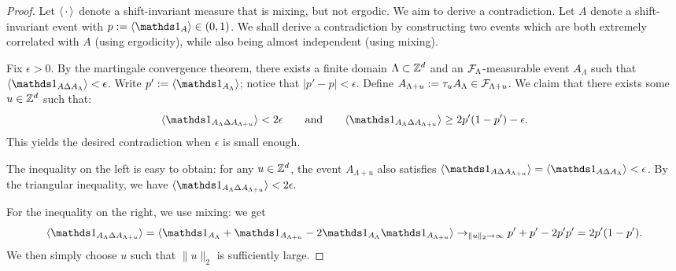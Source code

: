 \begin{proof}
    Let $\langle\,\cdot\,\rangle$ denote a shift-invariant measure that is mixing, but not ergodic.
    We aim to derive a contradiction.
    Let $A$ denote a shift-invariant event with $p:=\langle\ind{A}\rangle\in(0,1)$.
    We shall derive a contradiction by constructing two events which
    are both extremely correlated with $A$ (using ergodicity),
    while also being almost independent (using mixing).

    Fix $\epsilon>0$.
    By the martingale convergence theorem,
    there exists a finite domain $\Lambda\subset\mathbb Z^d$
    and an $\mathcal F_\Lambda$-measurable event
    $A_\Lambda$
    such that
    $\langle \ind{A\Delta A_\Lambda}\rangle<\epsilon$.
    Write $p':=\langle \ind{A_\Lambda}\rangle$;
    notice that $|p'-p|<\epsilon$.
    Define $A_{\Lambda+u}:=\tau_uA_\Lambda\in\mathcal F_{\Lambda+u}$.
    We claim that there exists some $u\in\mathbb Z^d$ such that:
    \[
        \langle \ind{A_\Lambda\Delta A_{\Lambda+u}}\rangle
        <2\epsilon
        \qquad
        \text{and}
        \qquad
        \langle \ind{A_\Lambda\Delta A_{\Lambda+u}}\rangle
        \geq 2p'(1-p')-\epsilon.
    \]
    This yields the desired contradiction when $\epsilon$ is small enough.

    The inequality on the left is easy to obtain:
    for any $u\in\mathbb Z^d$,
    the event $A_{\Lambda+u}$
    also satisfies
    $\langle \ind{A\Delta A_{\Lambda+u}}\rangle=\langle \ind{A\Delta A_\Lambda}\rangle<\epsilon$.
    By the triangular inequality, we have
    \(
        \langle \ind{A_\Lambda\Delta A_{\Lambda+u}}\rangle
        <2\epsilon.
    \)

    For the inequality on the right, we use mixing:
    we get
    \[
        \langle \ind{A_\Lambda\Delta A_{\Lambda+u}}\rangle
        =
        \langle \ind{A_\Lambda}+\ind{A_{\Lambda+u}}
        -
        2 \ind{A_\Lambda}\ind{A_{\Lambda+u}}\rangle
        \to_{\|u\|_2\to\infty}
        p'+p'-2p'p'
        =2p'(1-p').
    \]
    We then simply choose $u$ such that $\|u\|_2$ is sufficiently large.
\end{proof}



